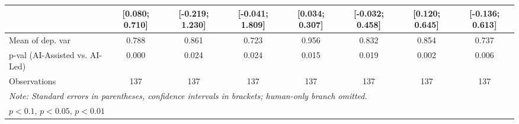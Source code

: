 \begin{tabular}{l*{7}{c}}
                    &[0.080; 0.710]   &[-0.219; 1.230]   &[-0.041; 1.809]   &[0.034; 0.307]   &[-0.032; 0.458]   &[0.120; 0.645]   &[-0.136; 0.613]   \\
\hline
Mean of dep. var    &       0.788   &       0.861   &       0.723   &       0.956   &       0.832   &       0.854   &       0.737   \\
p-val (AI-Assisted vs. AI-Led)&       0.000   &       0.024   &       0.024   &       0.015   &       0.019   &       0.002   &       0.006   \\
Observations        &         137   &         137   &         137   &         137   &         137   &         137   &         137   \\
\hline\hline
\multicolumn{8}{l}{\it{Note:} Standard errors in parentheses, confidence intervals in brackets; human-only branch omitted.}\\
\multicolumn{8}{l}{\sym{*} \(p<0.1\), \sym{**} \(p<0.05\), \sym{***} \(p<0.01\)}\\
\end{tabular}

